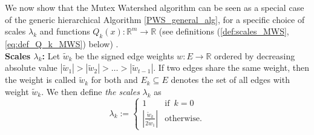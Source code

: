 

We now show that the Mutex Watershed algorithm can be seen as a special case of the generic hierarchical Algorithm \ref{PWS_general_alg}, for a specific choice of scales $\lambda_k$ and functions ${Q_k(x): \mathbb{R}^{m} \rightarrow \mathbb{R}}$ (see definitions (\ref{def:scales_MWS}, \ref{eq:def_Q_k_MWS}) below) . \\

\noindent \textbf{Scales $\lambda_k$:} Let $\tilde{w}_k$ be the signed edge weights $w: E \rightarrow \mathbb{R}$ ordered by decreasing absolute value $|\tilde{w}_1| > |\tilde{w}_2| > \ldots > |\tilde{w}_{t-1}|$. If two edges share the same weight, then the weight is called $\tilde{w}_k$ for both and $E_k \subseteq E$ denotes the set of all edges with weight $\tilde{w}_k$. We then define \textit{the scales} $\lambda_k$ as 
\begin{equation}
\lambda_k := 
\begin{cases}
1 & \text{if} \,\,\, k=0 \\
\left| \frac{\tilde{w}_k}{2\tilde{w}_1} \right| & \text{otherwise.}
\end{cases}\label{def:scales_MWS}
\end{equation}

